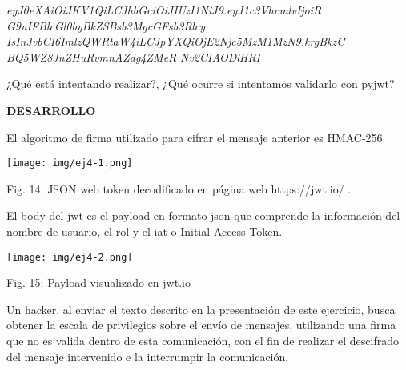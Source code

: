 \documentclass[12pt,oneside,a4paper]{book}
\begin{document}
\textit{eyJ0eXAiOiJKV1QiLCJhbGciOiJIUzI1NiJ9.eyJ1c3VhcmlvIjoiR
G9uIFBlcGl0byBkZSBsb3MgcGFsb3Rlcy}
\newline
\textit{IsInJvbCI6ImlzQWRtaW4iLCJpYXQiOjE2Njc5MzM1MzN9.krgBkzC
BQ5WZ8JnZHuRvmnAZdg4ZMeR}
\newline
\textit{Nv2CIAODlHRI}

\vspace{1em}

¿Qué está intentando realizar?, ¿Qué ocurre si intentamos validarlo con pyjwt?

\vspace{2em}

\hspace{20pt} \textbf{DESARROLLO}

\vspace{1em}

\hspace{20pt}
El algoritmo de firma utilizado para cifrar el mensaje anterior es HMAC-256.

\vspace{2em}

\begin{center}
    \texttt{[image: img/ej4-1.png]}
    
\vspace{0.1em}
    
    Fig. 14: JSON web token decodificado en página web https://jwt.io/ .
\end{center}

\vspace{2em}

\hspace{20pt}
El body del jwt es el payload en formato json que comprende la información del nombre de usuario, el rol y el iat o Initial Access Token.

\vspace{2em}

\begin{center}
    \texttt{[image: img/ej4-2.png]}
    
\vspace{0.1em}
    
    Fig. 15: Payload visualizado en jwt.io
\end{center}

\vspace{2em}

\hspace{20pt}
Un hacker, al enviar el texto descrito en la presentación de este ejercicio, busca obtener la escala de privilegios sobre el envío de mensajes, utilizando una firma que no es valida dentro de esta comunicación, con el fin de realizar el descifrado del mensaje intervenido e la interrumpir la comunicación.
\end{document}
